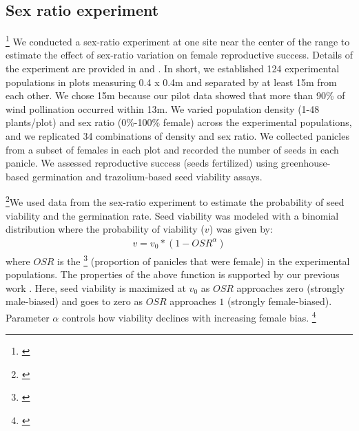 \documentclass[12pt]{article}
\newcommand{\tom}[2]{{\color{red}{#1}}\footnote{\textit{\color{red}{#2}}}}
\begin{document}
\subsection*{Sex ratio experiment}
\tom{}{You say nothing about this experiment in the Results or Discussion, so in its current state this section serves no purpose in this paper.}
We conducted a sex-ratio experiment at one site near the center of the range to estimate the effect of sex-ratio variation on female reproductive success.
Details of the experiment are provided in \cite{compagnoni2017can} and \cite{miller2022two}.
In short, we established 124 experimental populations in plots measuring 0.4 x 0.4m and separated by at least 15m from each other. 
We chose 15m because our pilot data showed that more than 90\% of wind pollination occurred within 13m. 
We varied population density (1-48 plants/plot) and sex ratio (0\%-100\% female) across the experimental populations, and we replicated 34 combinations of density and sex ratio. 
We collected panicles from a subset of females in each plot and recorded the number of seeds in each panicle.
We assessed reproductive success (seeds fertilized) using greenhouse-based germination and trazolium-based seed viability assays. 

\tom{}{I think the data analysis methods could be better organized. Here you describe the experimental methods and data analysis in the same section, but for the common garden experiment you split them.}We used data from the sex-ratio experiment to estimate the probability of seed viability and the germination rate. 
Seed viability was modeled with a binomial distribution where the probability of viability ($v$) was given by:
\begin{align}\label{eq:viab_fn}
v = v_{0} * (1 - OSR^{\alpha})
\end{align}
\noindent where $OSR$ is the \tom{operational sex ratio}{I tried to add a little about this, but generally I think the concept of the operational sex ratio is under-developed throughought the manuscript. It is the main way through which sex-specific climate responses can feed back to influence lambda, so it warrants greater attention.} (proportion of panicles that were female) in the experimental populations.
The properties of the above function is supported by our previous work \citep{compagnoni2017can}. 
Here, seed viability is maximized at $v_{0}$ as $OSR$ approaches zero (strongly male-biased) and goes to zero as $OSR$ approaches $1$ (strongly female-biased).
Parameter $\alpha$ controls how viability declines with increasing female bias.
\tom{}{Throughout the methods I recognize a lot of the text as coming directly from the Am Nat paper. I strongly recommend that you diversify your language and never use published text verbatim. Many journals use plagiarism detection software and this will raise a red flag, even if we are plagiarizing ourselves.}
\end{document}
